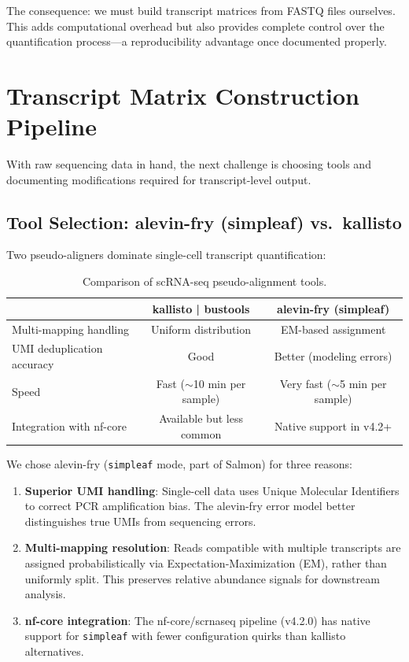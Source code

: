 The consequence: we must build transcript matrices from FASTQ files ourselves. This adds computational overhead but also provides complete control over the quantification process---a reproducibility advantage once documented properly.

\section{Transcript Matrix Construction Pipeline}

With raw sequencing data in hand, the next challenge is choosing tools and documenting modifications required for transcript-level output.

\subsection*{Tool Selection: alevin-fry (simpleaf) vs.\ kallisto}

Two pseudo-aligners dominate single-cell transcript quantification:

\begin{table}[htbp]
    \centering
    \caption{Comparison of scRNA-seq pseudo-alignment tools.}\label{tab:pseudoalign-tools}
    \vspace{0.5em}
    \small
    \setlength{\tabcolsep}{3pt}
    \begin{tabular}{lcc}
        \toprule
        & \textbf{kallisto | bustools} & \textbf{alevin-fry (simpleaf)} \\
        \midrule
        Multi-mapping handling & Uniform distribution & EM-based assignment \\
        UMI deduplication accuracy & Good & Better (modeling errors) \\
        Speed & Fast ($\sim$10 min per sample) & Very fast ($\sim$5 min per sample) \\
        Integration with nf-core & Available but less common & Native support in v4.2+ \\
        \bottomrule
    \end{tabular}
\end{table}

We chose alevin-fry (\texttt{simpleaf} mode, part of Salmon) for three reasons:

\begin{enumerate}
    \item \textbf{Superior UMI handling}: Single-cell data uses Unique Molecular Identifiers to correct PCR amplification bias. The alevin-fry error model better distinguishes true UMIs from sequencing errors.
    \item \textbf{Multi-mapping resolution}: Reads compatible with multiple transcripts are assigned probabilistically via Expectation-Maximization (EM), rather than uniformly split. This preserves relative abundance signals for downstream analysis.
    \item \textbf{nf-core integration}: The nf-core/scrnaseq pipeline (v4.2.0) has native support for \texttt{simpleaf} with fewer configuration quirks than kallisto alternatives.
\end{enumerate}

